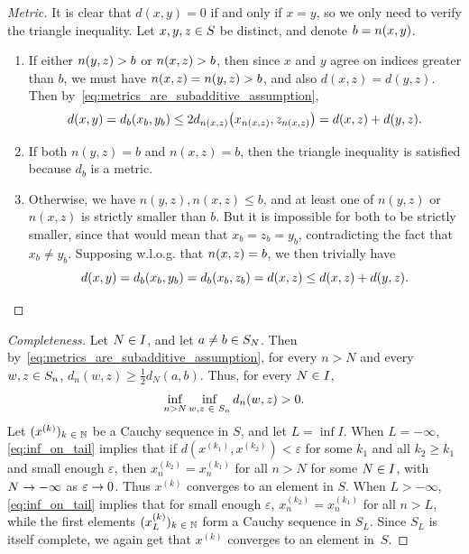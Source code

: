 \documentclass[AHL,Unicode]{cedram}
\newcommand*\n{\mathbb{N}}
\newcommand*\eps{\varepsilon}
\newcommand*\indexx[2]{n\left(#1,#2\right)}
\let\originalleft\left
\let\originalright\right
\renewcommand{\left}{\mathopen{}\mathclose\bgroup\originalleft}
\renewcommand{\right}{\aftergroup\egroup\originalright}
\renewcommand*{\to}{\mathchoice{\longrightarrow}{\rightarrow}{\rightarrow}{\rightarrow}}
\let\oldin\in
\renewcommand{\in}{\mathchoice{\oldin}{\oldin}{\,\oldin\,}{\,\oldin\,}}
\begin{document}
\begin{proofc}
\begin{proof}[{Metric}]
It is clear that $d(x,y)=0$ if and only if $x=y$, so we only need to verify the triangle inequality. Let $x,y,z\in S$ be distinct, and denote $b=\indexx xy$.
\begin{enumerate}
\item If either $\indexx yz>b$ or $\indexx xz>b$, then since $x$ and $y$ agree on indices greater than $b$, we must have $\indexx xz=\indexx yz>b$, and also $d(x,z)=d(y,z)$. Then by~\eqref{eq:metrics_are_subadditive_assumption},
\[
d\left(x,y\right)=d_{b}\left(x_{b},y_{b}\right)\leq2d_{\indexx xz}\left(x_{\indexx xz},z_{\indexx xz}\right)=d\left(x,z\right)+d\left(y,z\right).
\]
\item If both $n(y,z)=b$ and $n(x,z)=b$, then the triangle inequality is satisfied because $d_{b}$ is a metric.
\item Otherwise, we have $n(y,z),n(x,z)\leq b$, and at least one of $n(y,z)$ or $n(x,z)$ is strictly smaller than $b.$ But it is impossible for both to be strictly smaller, since that would mean that $x_{b}=z_{b}=y_{b}$, contradicting the fact that $x_{b}\neq y_{b}$. Supposing w.l.o.g. that $\indexx xz=b$, we then trivially have
\[
d\left(x,y\right)=d_{b}\left(x_{b},y_{b}\right)=d_{b}\left(x_{b},z_{b}\right)=d\left(x,z\right)\leq d\left(x,z\right)+d\left(y,z\right).
\]
\end{enumerate}
\let\qed\relax
\end{proof}
\begin{proof}[{Completeness}]
Let $N\in I$, and let $a\neq b\in S_{N}$. Then by~\eqref{eq:metrics_are_subadditive_assumption}, for every $n>N$ and every $w,z\in S_{n}$, $d_{n}(w,z)\geq\frac{1}{2}d_{N}(a,b)$. Thus, for every $N\in I$,
\begin{equation}
\inf_{n>N}\inf_{w,z\in S_{n}}d_{n}\left(w,z\right)>0.\label{eq:inf_on_tail}
\end{equation}
Let $(x^{(k)})_{k\in\n}$ be a Cauchy sequence in $S$, and let $L=\inf I$. When $L=-\infty$, \eqref{eq:inf_on_tail} implies that if $d(x^{(k_{1})},x^{(k_{2})})<\eps$ for some $k_{1}$ and all $k_{2}\geq k_{1}$ and small enough $\eps$, then $x_{n}^{(k_{2})}=x_{n}^{(k_{1})}$ for all $n>N$ for some $N\in I$, with $N\to-\infty$ as $\eps\to0$. Thus $x^{(k)}$ converges to an element in $S$. When $L>-\infty$, \eqref{eq:inf_on_tail} implies that for small enough $\eps$, $x_{n}^{(k_{2})}=x_{n}^{(k_{1})}$ for all $n>L$, while the first elements $(x_{L}^{(k)})_{k\in\n}$ form a Cauchy sequence in $S_{L}$. Since $S_{L}$ is itself complete, we again get that $x^{(k)}$ converges to an element in~$S$.\let\qed\relax

\end{proof}
\end{proofc}
\end{document}
